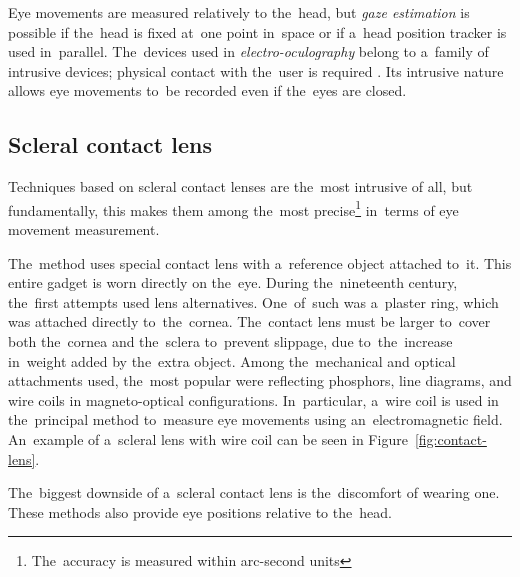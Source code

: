 Eye movements are measured relatively to the~head, but \emph{gaze estimation} is possible if the~head is fixed at~one point in~space or if a~head position tracker is used in~parallel. The~devices used in \emph{electro-oculography} belong to a~family of intrusive devices; physical contact with the~user is required \cite{cognolato2018}. Its intrusive nature allows eye movements to~be recorded even if the~eyes are closed.

\pagebreak
\subsection{Scleral contact lens}
Techniques based on scleral contact lenses are the~most intrusive of all, but fundamentally, this makes them among the~most precise\footnote{The~accuracy is measured within arc-second units} in~terms of eye movement measurement.

The~method uses special contact lens with a~reference object attached to~it. This entire gadget is worn directly on the~eye. During the~nineteenth century, the~first attempts used lens alternatives. One~of~such was a~plaster ring, which was attached directly to~the~cornea. The~contact lens must be larger to~cover both the~cornea and the~sclera to~prevent slippage, due to~the~increase in~weight added by the~extra object. Among the~mechanical and optical attachments used, the~most popular were reflecting phosphors, line diagrams, and wire coils in magneto-optical configurations. In~particular, a~wire coil is used in the~principal method to~measure eye movements using an~electromagnetic field. An~example of a~scleral lens with wire coil can be seen in Figure~\ref{fig:contact-lens}.

The~biggest downside of a~scleral contact lens is the~discomfort of wearing one. These methods also provide eye positions relative to the~head.


